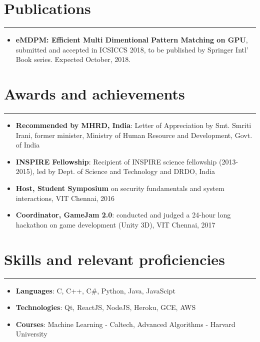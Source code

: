 \documentclass[9pt, a4paper]{article}
\begin{document}
\section*{Publications}
\vspace{-8px}
\hrule
\vspace{8px}
\begin{itemize}
	\item \textbf{eMDPM: Efficient Multi Dimentional Pattern Matching on GPU}, submitted and accepted in ICSICCS 2018, to be published by Springer Intl' Book series. Expected October, 2018.
\end{itemize}

\section*{Awards and achievements}
\vspace{-8px}
\hrule
\vspace{8px}
\begin{itemize}
	\item \textbf{Recommended by MHRD, India}: Letter of Appreciation by Smt. Smriti Irani, former minister, Ministry of Human Resource and Development, Govt. of India
	\item \textbf{INSPIRE Fellowship}: Recipient of INSPIRE science fellowship (2013-2015), led by Dept. of Science and Technology and DRDO, India
	\item \textbf{Host, Student Symposium} on security fundamentals and system interactions, VIT Chennai, 2016
	\item \textbf{Coordinator, GameJam 2.0}: conducted and judged a 24-hour long hackathon on game development (Unity 3D), VIT Chennai, 2017
\end{itemize}

\section*{Skills and relevant proficiencies}
\vspace{-8px}
\hrule
\vspace{8px}
\begin{itemize}
	\item \textbf{Languages}: C, C++, C\#, Python, Java, JavaScipt
	\item \textbf{Technologies}: Qt, ReactJS, NodeJS, Heroku, GCE, AWS
	\item \textbf{Courses}: Machine Learning - Caltech, Advanced Algorithms - Harvard University
\end{itemize}
\end{document}
